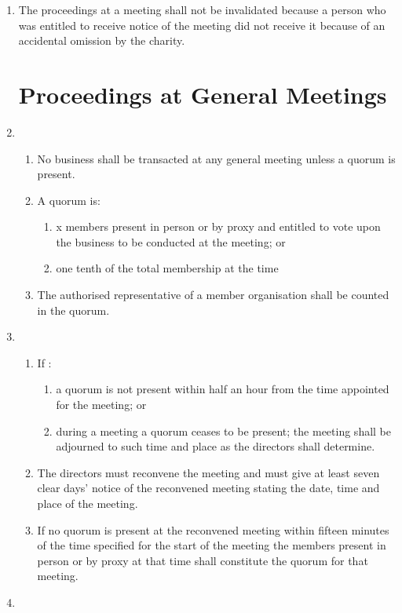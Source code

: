 \begin{enumerate}
\item
  The proceedings at a meeting shall not be invalidated because a
  person who was entitled to receive notice of the meeting did not
  receive it because of an accidental omission by the charity.

\section{Proceedings at General Meetings}

\item
  \begin{enumerate}
  \item
    No business shall be transacted at any general meeting unless a
    quorum is present.
  \item
    A quorum is:
    \begin{enumerate}
    \item x members present in person or by proxy and entitled to vote upon
      the business to be conducted at the meeting; or
    \item
      one tenth of the total membership at the time
    \end{enumerate}
  \item
    The authorised representative of a member organisation shall be
    counted in the quorum.
  \end{enumerate}

\item
  \begin{enumerate}
  \item
    If :
    \begin{enumerate}
    \item
      a quorum is not present within half an hour from the time appointed
      for the meeting; or
    \item
      during a meeting a quorum ceases to be present; the meeting shall
      be adjourned to such time and place as the directors shall
      determine.
    \end{enumerate}
  \item
    The directors must reconvene the meeting and must give at least
    seven clear days' notice of the reconvened meeting stating the
    date, time and place of the meeting.
  \item
    If no quorum is present at the reconvened meeting within fifteen
    minutes of the time specified for the start of the meeting the
    members present in person or by proxy at that time shall constitute
    the quorum for that meeting.
  \end{enumerate}
\item
  


\end{enumerate}
